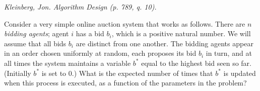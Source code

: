 \documentclass[solutionorbox,answers]{exam}
\begin{document}
\begin{questions}
\newpage


  \question \textit{Kleinberg, Jon. Algorithm Design (p. 789, q. 10).} 
  
  Consider a very simple online auction system that works as follows. There are $n$ \textit{bidding agents}; agent $i$
has a bid $b_i$, which is a positive natural number. We will assume that all bids $b_i$ are distinct from one
another. The bidding agents appear in an order chosen uniformly at random, each proposes its bid $b_i$ in
turn, and at all times the system maintains a variable $b^*$ equal to the highest bid seen so far. (Initially
$b^*$ is set to $0$.) What is the expected number of times that $b^*$ is updated when this process is executed,
as a function of the parameters in the problem?



  \begin{solutionbox}{} \vspace{1em} 

  
  \end{solutionbox}


\end{questions}
\end{document}
